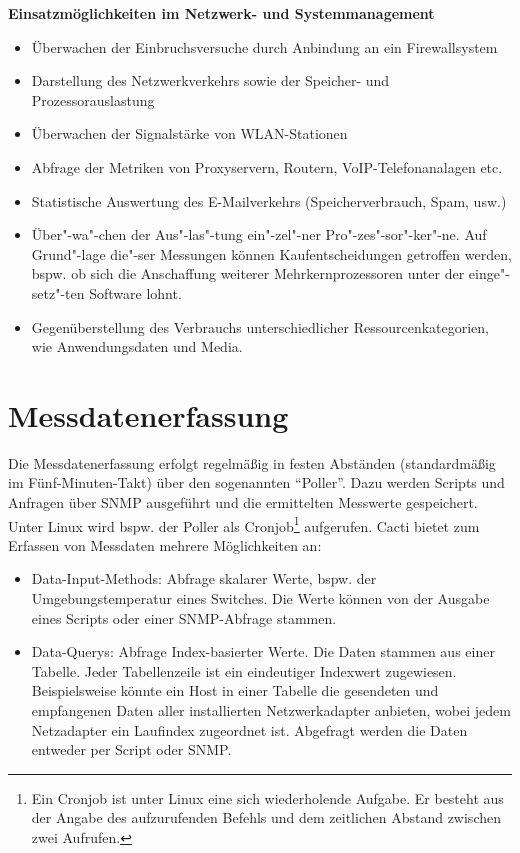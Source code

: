 \documentclass[12pt,ngerman,toc=listofnumbered,toc=bibliographynumbered,toc=index,headsepline=true]{scrbook}
\begin{document}
\textbf{Einsatzmöglichkeiten im Netzwerk- und Systemmanagement}
\begin{itemize}
  \item Überwachen der Einbruchsversuche durch Anbindung an ein Firewallsystem
  \item Darstellung des Netzwerkverkehrs sowie der Speicher- und Prozessorauslastung
  \item Überwachen der Signalstärke von WLAN-Stationen
  \item Abfrage der Metriken von Proxyservern, Routern, VoIP-Telefonanalagen
  etc.
  \item Statistische Auswertung des E-Mailverkehrs (Speicherverbrauch, Spam,
  usw.)
  \item Über"-wa"-chen der Aus"-las"-tung ein"-zel"-ner Pro"-zes"-sor"-ker"-ne. Auf Grund"-lage die"-ser Messungen können Kaufentscheidungen getroffen werden, bspw. ob sich die Anschaffung weiterer Mehrkernprozessoren unter der einge"-setz"-ten Software lohnt.
  \item Gegenüberstellung des Verbrauchs unterschiedlicher Ressourcenkategorien, wie Anwendungsdaten und Media.
\end{itemize}

\section{Messdatenerfassung}
Die Messdatenerfassung erfolgt regelmäßig in festen Abständen (standardmäßig im
Fünf-Minuten-Takt) über den sogenannten \enquote{Poller}. Dazu werden Scripts
und Anfragen über SNMP ausgeführt und die ermittelten Messwerte gespeichert. Unter
Linux wird bspw. der Poller als Cronjob\footnote{Ein Cronjob ist unter Linux
eine sich wiederholende Aufgabe. Er besteht aus der Angabe des aufzurufenden
Befehls und dem zeitlichen Abstand zwischen zwei Aufrufen.} aufgerufen. Cacti
bietet zum Erfassen von Messdaten mehrere Möglichkeiten an:
\begin{itemize}
  \item Data-Input-Methods: Abfrage skalarer Werte, bspw. der
  Umgebungstemperatur eines Switches. Die Werte können von der Ausgabe eines
  Scripts oder einer SNMP-Abfrage stammen.
  \item Data-Querys: Abfrage Index-basierter Werte. Die Daten stammen aus einer
  Tabelle. Jeder Tabellenzeile ist ein eindeutiger Indexwert zugewiesen.
  Beispielsweise könnte ein Host in einer Tabelle die gesendeten und empfangenen
  Daten aller installierten Netzwerkadapter anbieten, wobei jedem Netzadapter
  ein Laufindex zugeordnet ist. Abgefragt werden die Daten entweder per Script
  oder SNMP.
\end{itemize}
\end{document}
